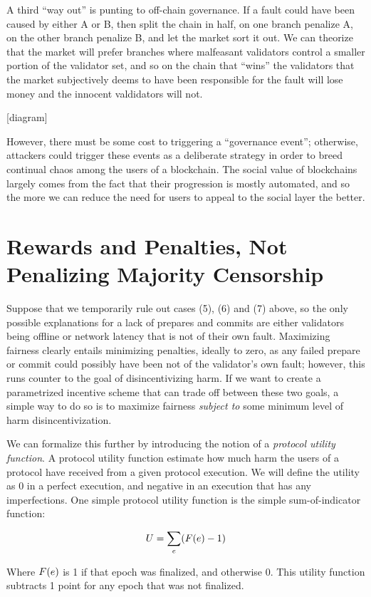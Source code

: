 \documentclass[12pt, final]{article}
\newcommand{\epoch}{\ensuremath{e}\space}
\begin{document}
A third ``way out'' is punting to off-chain governance. If a fault could have been caused by either A or B, then split the chain in half, on one branch penalize A, on the other branch penalize B, and let the market sort it out. We can theorize that the market will prefer branches where malfeasant validators control a smaller portion of the validator set, and so on the chain that ``wins'' the validators that the market subjectively deems to have been responsible for the fault will lose money and the innocent valdidators will not.

[diagram]

However, there must be some cost to triggering a ``governance event''; otherwise, attackers could trigger these events as a deliberate strategy in order to breed continual chaos among the users of a blockchain. The social value of blockchains largely comes from the fact that their progression is mostly automated, and so the more we can reduce the need for users to appeal to the social layer the better.

\section{Rewards and Penalties, Not Penalizing Majority Censorship}

Suppose that we temporarily rule out cases (5), (6) and (7) above, so the only possible explanations for a lack of prepares and commits are either validators being offline or network latency that is not of their own fault. Maximizing fairness clearly entails minimizing penalties, ideally to zero, as any failed prepare or commit could possibly have been not of the validator's own fault; however, this runs counter to the goal of disincentivizing harm. If we want to create a parametrized incentive scheme that can trade off between these two goals, a simple way to do so is to maximize fairness \textit{subject to} some minimum level of harm disincentivization.

We can formalize this further by introducing the notion of a \textit{protocol utility function}. A protocol utility function estimate how much harm the users of a protocol have received from a given protocol execution. We will define the utility as $0$ in a perfect execution, and negative in an execution that has any imperfections. One simple protocol utility function is the simple sum-of-indicator function:

$$U = \sum_{\epoch} (F(\epoch) - 1)$$

Where $F(\epoch)$ is 1 if that epoch was finalized, and otherwise 0. This utility function subtracts 1 point for any epoch that was not finalized.
\end{document}
